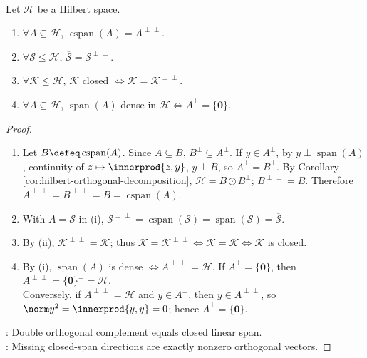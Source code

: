 \begin{theorem} \label{thm:hilbert-double-orthogonal-complement} \\
Let $\mathcal{H}$ be a Hilbert space.
\begin{enumerate}[label=(\roman*)]
\setlength{\itemsep}{0pt}
\item $\forall A\subseteq\mathcal{H}$, $\operatorname{cspan}(A)=A^{\perp\perp}$.
\item $\forall\mathcal{S}\leq\mathcal{H}$, $\overline{\mathcal{S}}=\mathcal{S}^{\perp\perp}$.
\item $\forall\mathcal{K}\leq\mathcal{H}$, $\mathcal{K}$ closed $\Longleftrightarrow\mathcal{K}=\mathcal{K}^{\perp\perp}$.
\item $\forall A\subseteq\mathcal{H}$, $\operatorname{span}(A)$ dense in $\mathcal{H}\Longleftrightarrow A^\perp=\{\mathbf{0}\}$.
\end{enumerate}
\begin{proof}
\begin{enumerate}[label=(\roman*)]
\setlength{\itemsep}{0pt}
\item Let $B\defeq\operatorname{cspan}(A)$. Since $A\subseteq B$, $B^\perp\subseteq A^\perp$. If $y\in A^\perp$, by $y\perp\operatorname{span}(A)$, continuity of $z\mapsto\innerprod{z,y}$, $y\perp B$, so $A^\perp=B^\perp$. By Corollary \ref{cor:hilbert-orthogonal-decomposition}, $\mathcal H=B\odot B^\perp$; $B^{\perp\perp}=B$. Therefore $A^{\perp\perp}=B^{\perp\perp}=B=\operatorname{cspan}(A)$.
\item With $A=\mathcal S$ in (i), $\mathcal S^{\perp\perp}=\operatorname{cspan}(\mathcal S)=\overline{\operatorname{span}(\mathcal S)}=\overline{\mathcal S}$.
\item By (ii), $\mathcal K^{\perp\perp}=\overline{\mathcal K}$; thus $\mathcal K=\mathcal K^{\perp\perp}\Longleftrightarrow\mathcal K=\overline{\mathcal K}\Longleftrightarrow\mathcal K$ is closed.
\item By (i), $\operatorname{span}(A)$ is dense $\Longleftrightarrow A^{\perp\perp}=\mathcal H$. If $A^\perp=\{\mathbf0\}$, then $A^{\perp\perp}=\{\mathbf0\}^\perp=\mathcal H$.\\
Conversely, if $A^{\perp\perp}=\mathcal H$ and $y\in A^\perp$, then $y\in A^{\perp\perp}$, so $\norm y^2=\innerprod{y,y}=0$; hence $A^\perp=\{\mathbf0\}$.
\end{enumerate}
: Double orthogonal complement equals closed linear span.\\
: Missing closed-span directions are exactly nonzero orthogonal vectors.
\end{proof}
\end{theorem}

